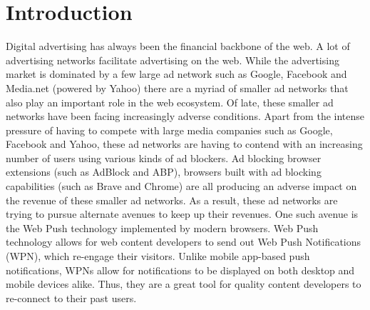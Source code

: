 
\section{Introduction}
Digital advertising has always been the financial backbone of the web. A lot of advertising networks facilitate advertising on the web. While the advertising market is dominated by a few large ad network such as Google, Facebook and Media.net (powered by Yahoo) there are a myriad of smaller ad networks that also play an important role in the web ecosystem. Of late, these smaller ad networks have been facing increasingly adverse conditions. Apart from the intense pressure of having to compete with large media companies such as Google, Facebook and Yahoo, these ad networks are having to contend with an increasing number of users using various kinds of ad blockers. Ad blocking browser extensions (such as AdBlock and ABP), browsers built with ad blocking capabilities (such as Brave and Chrome) are all producing an adverse impact on the revenue of these smaller ad networks. As a result, these ad networks are trying to pursue alternate avenues to keep up their revenues. One such avenue is the Web Push technology implemented by modern browsers. Web Push technology allows for web content developers to send out Web Push Notifications (WPN), which re-engage their visitors. Unlike mobile app-based push notifications, WPNs allow for notifications to be displayed on both desktop and mobile devices alike. Thus, they are a great tool for quality content developers to re-connect to their past users.  

